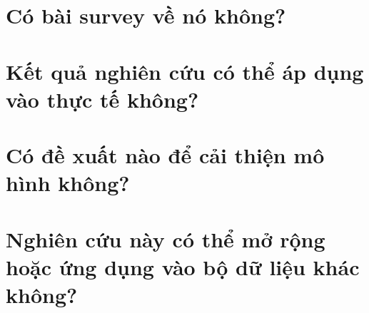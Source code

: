 \documentclass{article}
\begin{document}
\section{Có bài survey về nó không?}


% 

% 

% 

\section{Kết quả nghiên cứu có thể áp dụng vào thực tế không?}


\section{Có đề xuất nào để cải thiện mô hình không?}


\section{Nghiên cứu này có thể mở rộng hoặc ứng dụng vào bộ dữ liệu khác không?}

\end{document}
